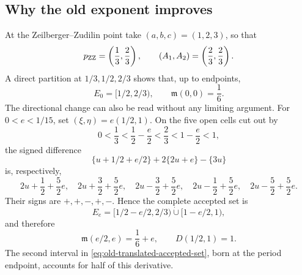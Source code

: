 \documentclass[11pt,reqno,letterpaper]{amsart}
\numberwithin{equation}{section}
\theoremstyle{definition}
\theoremstyle{remark}
\begin{document}
\subsection{Why the old exponent improves}

At the Zeilberger--Zudilin point take \((a,b,c)=(1,2,3)\), so that
\[
 p_{\rm ZZ}=\left(\frac13,\frac23\right),\qquad
 (A_1,A_2)=\left(\frac23,\frac23\right).
\]
A direct partition at \(1/3,1/2,2/3\) shows that, up to endpoints,
\begin{equation}\label{eq:old-accepted-set}
 E_0=[1/2,2/3),\qquad \mathfrak m(0,0)=\frac16.
\end{equation}
The directional change can also be read without any limiting argument.
For \(0<e<1/15\), set \((\xi,\eta)=e(1/2,1)\).  On the five open cells
cut out by
\[
 0<\frac13<\frac12-\frac e2<\frac23<1-\frac e2<1,
\]
the signed difference
\[
 \{u+1/2+e/2\}+2\{2u+e\}-\{3u\}
\]
is, respectively,
\[
 2u+\frac12+\frac52e,\quad
 2u+\frac32+\frac52e,\quad
 2u-\frac32+\frac52e,\quad
 2u-\frac12+\frac52e,\quad
 2u-\frac52+\frac52e.
\]
Their signs are \(+,+,-,+,-\).  Hence the complete accepted set is
\begin{equation}\label{eq:old-translated-accepted-set}
 E_e=[1/2-e/2,2/3)\mathbin{\dot\cup}[1-e/2,1),
\end{equation}
and therefore
\begin{equation}\label{eq:old-directional-D}
 \mathfrak m(e/2,e)=\frac16+e,\qquad D(1/2,1)=1.
\end{equation}
The second interval in \eqref{eq:old-translated-accepted-set}, born at
the period endpoint, accounts for half of this derivative.
\end{document}

